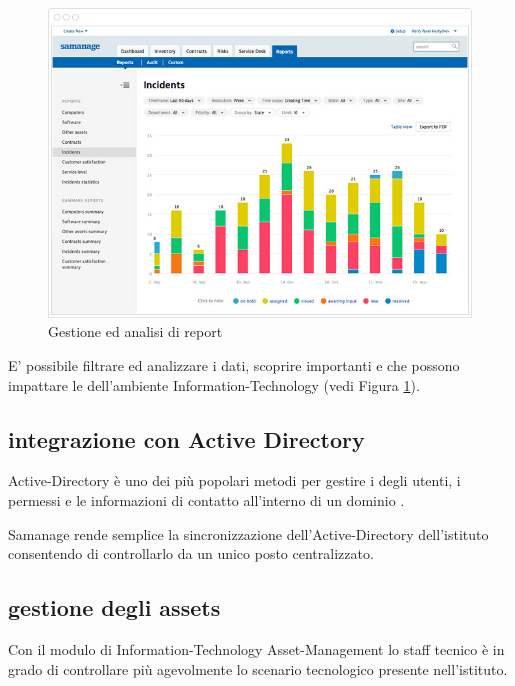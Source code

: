 \begin{figure}[htbp]
\centering
\includegraphics[scale=0.6]{Images/samanage/Report_management.png}
\caption{Gestione ed analisi di report}
\label{sd-tools-report-img}
\end{figure}

E' possibile filtrare ed analizzare i dati, scoprire importanti  e  che possono impattare le  dell'ambiente \acs{Information-Technology} (vedi Figura \ref{sd-tools-report-img}).

\subsection[Integrazione con Active Directory]{integrazione con Active Directory}
\label{sd-tools-ad}
\acf{Active-Directory} è uno dei più popolari metodi per gestire i  degli utenti, i permessi e le informazioni di contatto all'interno di un dominio .

Samanage rende semplice la sincronizzazione dell'\ac{Active-Directory} dell'istituto consentendo di controllarlo da un unico posto centralizzato.

\subsection[Gestione degli assets]{gestione degli assets}
\label{sd-samanage-assets}
Con il modulo di \acs{Information-Technology} \ac{Asset-Management} lo staff tecnico è in grado di controllare più agevolmente lo scenario tecnologico presente nell'istituto.

